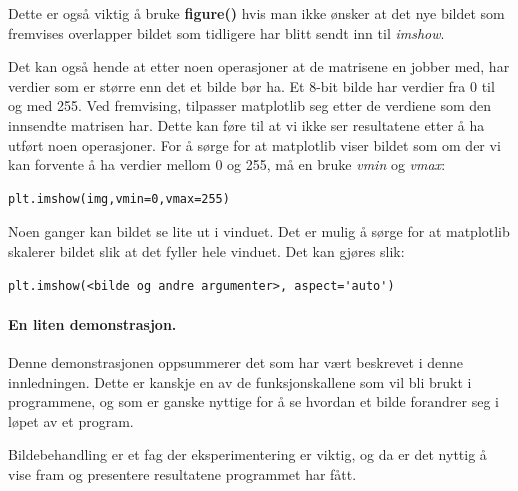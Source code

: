\documentclass[%
oneside,                 %
final,                   %
10pt]{article}
\begin{document}
Dette er også viktig å bruke \textbf{figure()} hvis man ikke ønsker at det nye bildet som fremvises overlapper bildet som tidligere har blitt sendt inn til \emph{imshow}.



\vspace{3mm}


Det kan også hende at etter noen operasjoner at de matrisene en jobber med, har verdier som er større enn det et bilde bør ha. Et 8-bit bilde har verdier fra 0 til og med 255.
Ved fremvising, tilpasser matplotlib seg etter de verdiene som den innsendte matrisen har. Dette kan føre til at vi ikke ser resultatene etter å ha utført noen operasjoner.
For å sørge for at matplotlib viser bildet som om der vi kan forvente å ha verdier mellom 0 og 255, må en bruke \emph{vmin} og \emph{vmax}:
\begin{verbatim}
plt.imshow(img,vmin=0,vmax=255)
\end{verbatim}



\vspace{3mm}


Noen ganger kan bildet se lite ut i vinduet. Det er mulig å sørge for at matplotlib skalerer bildet slik at det fyller hele vinduet. Det kan gjøres slik:
\begin{verbatim}
plt.imshow(<bilde og andre argumenter>, aspect='auto')
\end{verbatim}
\paragraph{En liten demonstrasjon.}
\label{subsec:demo}
Denne demonstrasjonen oppsummerer det som har vært beskrevet i denne innledningen. Dette er kanskje en av de funksjonskallene som vil bli brukt i programmene, og som er ganske nyttige
for å se hvordan et bilde forandrer seg i løpet av et program.

Bildebehandling er et fag der eksperimentering er viktig, og da er det nyttig å vise fram og presentere resultatene programmet har fått.
\end{document}
